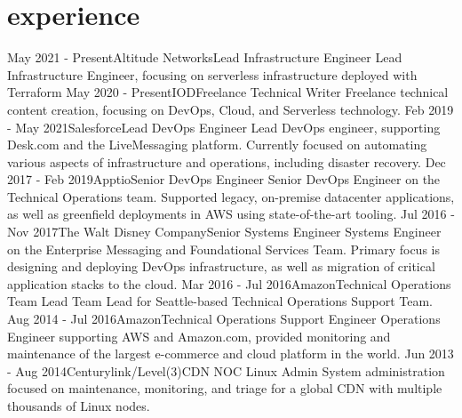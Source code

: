 \documentclass[]{mv_cv}
\begin{document}
\section{experience}
  \begin{explist}
    \expitem
    {May 2021 - Present}{Altitude Networks}{Lead Infrastructure Engineer}
    {Lead Infrastructure Engineer, focusing on serverless infrastructure deployed with Terraform}
    \expitem
    {May 2020 - Present}{IOD}{Freelance Technical Writer}
    {Freelance technical content creation, focusing on DevOps, Cloud, and Serverless technology.}
    \expitem
    {Feb 2019 - May 2021}{Salesforce}{Lead DevOps Engineer}
    {Lead DevOps engineer, supporting Desk.com and the LiveMessaging platform. Currently focused on automating various aspects of infrastructure and operations, including disaster recovery.}
    \expitem
    {Dec 2017 - Feb 2019}{Apptio}{Senior DevOps Engineer}
    {Senior DevOps Engineer on the Technical Operations team. Supported legacy, on-premise datacenter applications, as well as greenfield deployments in AWS using state-of-the-art tooling.}
    \expitem
    {Jul 2016 - Nov 2017}{The Walt Disney Company}{Senior Systems Engineer}
    {Systems Engineer on the Enterprise Messaging and Foundational Services Team. Primary focus is designing and deploying DevOps infrastructure, as well as migration of critical application stacks to the cloud.}
    \expitem
    {Mar 2016 - Jul 2016}{Amazon}{Technical Operations Team Lead}
    {Team Lead for Seattle-based Technical Operations Support Team.}
    \expitem
    {Aug 2014 - Jul 2016}{Amazon}{Technical Operations Support Engineer}
    {Operations Engineer supporting AWS and Amazon.com, provided monitoring and maintenance of the largest e-commerce and cloud platform in the world.}
   \expitem
    {Jun 2013 - Aug 2014}{Centurylink/Level(3)}{CDN NOC Linux Admin}
    {System administration focused on maintenance, monitoring, and triage for a global CDN with multiple thousands of Linux nodes.}
  \end{explist}

\thispagestyle{empty}
\end{document}
